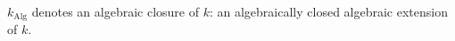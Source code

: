 $k_{\text{Alg}}$ denotes an algebraic closure of $k$: an algebraically closed algebraic extension of $k$.
